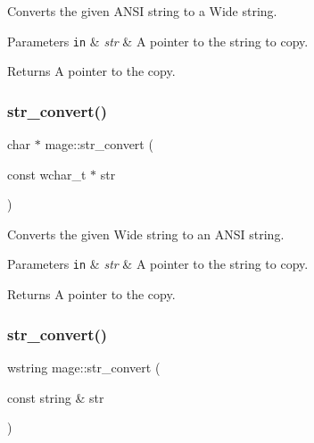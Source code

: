 Converts the given A\+N\+SI string to a Wide string.


\begin{DoxyParams}[1]{Parameters}
\mbox{\tt in}  & {\em str} & A pointer to the string to copy. \\
\hline
\end{DoxyParams}
\begin{DoxyReturn}{Returns}
A pointer to the copy. 
\end{DoxyReturn}
\hypertarget{namespacemage_a02da62c4ad787817700a446e56739270}{}\label{namespacemage_a02da62c4ad787817700a446e56739270} 
\subsubsection{\texorpdfstring{str\+\_\+convert()}{str\_convert()}\hspace{0.1cm}{\footnotesize\ttfamily [2/4]}}
{\footnotesize\ttfamily char $\ast$ mage\+::str\+\_\+convert (\begin{DoxyParamCaption}\item[{const wchar\+\_\+t $\ast$}]{str }\end{DoxyParamCaption})}

Converts the given Wide string to an A\+N\+SI string.


\begin{DoxyParams}[1]{Parameters}
\mbox{\tt in}  & {\em str} & A pointer to the string to copy. \\
\hline
\end{DoxyParams}
\begin{DoxyReturn}{Returns}
A pointer to the copy. 
\end{DoxyReturn}
\hypertarget{namespacemage_a7ce8ba404dec8488d86012662043d5a1}{}\label{namespacemage_a7ce8ba404dec8488d86012662043d5a1} 
\subsubsection{\texorpdfstring{str\+\_\+convert()}{str\_convert()}\hspace{0.1cm}{\footnotesize\ttfamily [3/4]}}
{\footnotesize\ttfamily wstring mage\+::str\+\_\+convert (\begin{DoxyParamCaption}\item[{const string \&}]{str }\end{DoxyParamCaption})}

